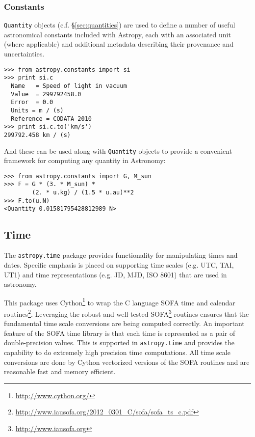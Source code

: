 \documentclass[traditabstract]{aa}
\begin{document}
\subsubsection{Constants}

\texttt{Quantity} objects (c.f. \S\ref{sec:quantities}) are used to define a
number of useful astronomical constants included with Astropy, each with an
associated unit (where applicable) and additional metadata describing their
provenance and uncertainties.
\begin{verbatim}
>>> from astropy.constants import si
>>> print si.c
  Name   = Speed of light in vacuum
  Value  = 299792458.0
  Error  = 0.0
  Units = m / (s)
  Reference = CODATA 2010
>>> print si.c.to('km/s')
299792.458 km / (s)
\end{verbatim}
And these can be used along with \texttt{Quantity} objects to provide a
convenient framework for computing any quantity in Astronomy:
\begin{verbatim}
>>> from astropy.constants import G, M_sun
>>> F = G * (3. * M_sun) *
        (2. * u.kg) / (1.5 * u.au)**2
>>> F.to(u.N)
<Quantity 0.01581795428812989 N>
\end{verbatim}

\subsection{Time}


The \texttt{astropy.time} package provides functionality for manipulating
times and dates.  Specific emphasis is placed on supporting time scales
(e.g. UTC, TAI, UT1) and time representations (e.g. JD, MJD, ISO 8601) that
are used in astronomy.

This package uses Cython\footnote{\url{http://www.cython.org/}} to wrap the C
language SOFA\citep{SOFA:2010-12-01} time and calendar
routines\footnote{\url{http://www.iausofa.org/2012_0301_C/sofa/sofa_ts_c.pdf}}.
Leveraging the robust and well-tested
SOFA\footnote{\url{http://www.iausofa.org}} routines ensures that the
fundamental time scale conversions are being computed correctly.  An important
feature of the SOFA time library is that each time is represented as a pair of
double-precision values.  This is supported in \texttt{astropy.time} and
provides the capability to do extremely high precision time computations.  All
time scale conversions are done by Cython vectorized versions of the SOFA
routines and are reasonable fast and memory efficient.
\end{document}
